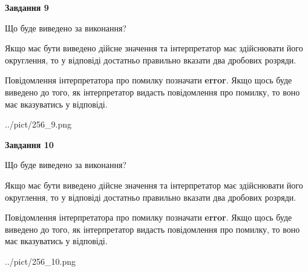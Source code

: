 \documentclass[12pt, ukrainian]{article}
\begin{document}
{\begin {Large}
{\begin {center}\textbf{Завдання 9}\end {center}}\par
Що буде виведено за виконання? \par

Якщо має бути виведено дійсне значення та інтерпретатор має здійснювати його округлення, 
то у відповіді достатньо правильно вказати два дробових розряди.

Повідомлення інтерпретатора про помилку позначати \textbf{error}.
Якщо щось буде виведено до того, як інтерпретатор видасть повідомлення про помилку, 
то воно має вказуватись у відповіді. \par

\begin{center}
	{../pict/256_9.png}
\end{center}
\newpage

{\begin {center}\textbf{Завдання 10}\end {center}}\par
Що буде виведено за виконання? \par

Якщо має бути виведено дійсне значення та інтерпретатор має здійснювати його округлення, 
то у відповіді достатньо правильно вказати два дробових розряди.

Повідомлення інтерпретатора про помилку позначати \textbf{error}.
Якщо щось буде виведено до того, як інтерпретатор видасть повідомлення про помилку, 
то воно має вказуватись у відповіді. \par

\begin{center}
	{../pict/256_10.png}
\end{center}
\newpage

\end {Large}}
\end{document}
